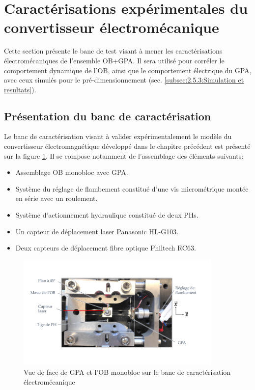 \section{Caractérisations expérimentales du convertisseur électromécanique}
\label{sec:3.3}
Cette section présente le banc de test visant à mener les caractérisations électromécaniques de l'ensemble OB+GPA. Il sera utilisé pour corréler le comportement dynamique de l'OB, ainsi que le comportement électrique du GPA, avec ceux simulés pour le pré-dimensionnement (sec. \ref{subsec:2.5.3:Simulation et resultats}).
	\subsection{Présentation du banc de caractérisation}
Le banc de caractérisation visant à valider expérimentalement le modèle du convertisseur électromagnétique développé dans le chapitre précédent est présenté sur la figure \ref{fig:BDT_OB+GPA}. Il se compose notamment de l'assemblage des éléments suivants:
\begin{itemize}[label=$\circ$]
	\item Assemblage OB monobloc avec GPA.
	\item Système du réglage de flambement constitué d'une vis micrométrique montée en série avec un roulement.
	\item Système d'actionnement hydraulique constitué de deux PHs.
	\item Un capteur de déplacement laser Panasonic HL-G103.
	\item Deux capteurs de déplacement fibre optique Philtech RC63.
\end{itemize}
\begin{figure}[!htbp]
\begin{center}
    \captionsetup{justification=centering}
	\includegraphics[trim={0.5cm 3cm 2cm 2.5cm},clip, width=0.9\textwidth]{../Chap3/Figure/BDT_OB+GPA.pdf}
	\caption{Vue de face de GPA et l'OB monobloc sur le banc de caractérisation électromécanique}
	\label{fig:BDT_OB+GPA}
\end{center}
\end{figure}
